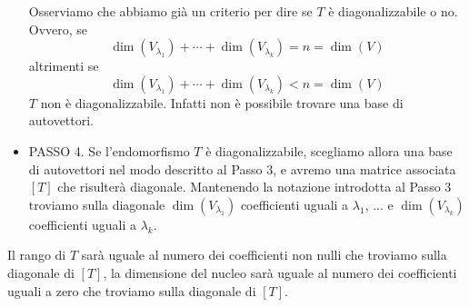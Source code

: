 \begin{itemize}
	      Osserviamo che abbiamo già un criterio per dire se $T$ è diagonalizzabile o no.
	      Ovvero, se
	      \[
		      \dim(V_{\lambda_1}) + \cdots + \dim(V_{\lambda_k}) = n = \dim(V)
	      \]
	      altrimenti se
	      \[
		      \dim(V_{\lambda_1}) + \cdots + \dim(V_{\lambda_k}) < n = \dim(V)
	      \]
	      $T$ non è diagonalizzabile. Infatti non è possibile trovare una base di
	      autovettori.
	\item PASSO 4. Se l'endomorfismo $T$ è diagonalizzabile, scegliamo allora una base di
	      autovettori nel modo descritto al Passo 3, e avremo una matrice associata $[T]$ che
	      risulterà diagonale. Mantenendo la notazione introdotta al Passo 3 troviamo sulla
	      diagonale $\dim(V_{\lambda_1})$ coefficienti uguali a
	      $\lambda_1$, ... e $\dim(V_{\lambda_k})$ coefficienti uguali a $\lambda_k$.
\end{itemize}
Il rango di $T$ sarà uguale al numero dei coefficienti non nulli che troviamo
sulla diagonale di $[T]$, la dimensione del nucleo sarà uguale al numero dei
coefficienti uguali a zero che troviamo sulla diagonale di $[T]$.

